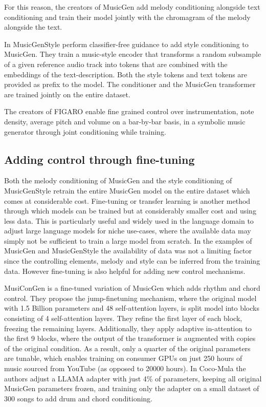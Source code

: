 For this reason, the creators of MusicGen \cite{copet2023simple} add melody conditioning alongside text conditioning and train their model jointly with the chromagram of the melody alongside the text.

In MusicGenStyle \cite{Rouard_Adi_Copet_Roebel_Défossez_musicgenstyle_2024} perform classifier-free guidance to add style conditioning to MusicGen. They train a music-style encoder that transforms a random subsample of a given reference audio track into tokens that are combined with the embeddings of the text-description. Both the style tokens and text tokens are provided as prefix to the model. The conditioner and the MusicGen transformer are trained jointly on the entire dataset. 

The creators of FIGARO\cite{Rütte_figaro_2023} enable fine grained control over instrumentation, note density, average pitch and volume on a bar-by-bar basis, in a symbolic music generator through joint conditioning while training. 

\subsection{Adding control through fine-tuning}

Both the melody conditioning of MusicGen \cite{copet2023simple} and the style conditioning of MusicGenStyle \cite{Rouard_Adi_Copet_Roebel_Défossez_musicgenstyle_2024} retrain the entire MusicGen model on the entire dataset which comes at considerable cost. Fine-tuning or transfer learning is another method through which models can be trained but at considerably smaller cost and using less data. This is particularly useful and widely used in the language domain to adjust large language models for niche use-cases, where the available data may simply not be sufficient to train a large model from scratch. In the examples of MusicGen and MusicGenStyle the availability of data was not a limiting factor since the controlling elements, melody and style can be inferred from the training data. However fine-tuning is also helpful for adding new control mechanisms.

MusiConGen \cite{Lan_Hsiao_Cheng_Yang_musicongen_2024} is a fine-tuned variation of MusicGen which adds rhythm and chord control. They propose the jump-finetuning mechanism, where the original model with 1.5 Billion parameters and 48 self-attention layers, is split model into blocks consisting of 4 self-attention layers. They refine the first layer of each block, freezing the remaining layers. Additionally, they apply adaptive in-attention to the first 9 blocks, where the output of the transformer is augmented with copies of the original condition. As a result, only a quarter of the original parameters are tunable, which enables training on consumer GPUs on just 250 hours of music sourced from YouTube (as opposed to 20000 hours).  In Coco-Mula \cite{Lin_cocomulla_2024} the authors adjust a LLAMA adapter with just 4\% of parameters, keeping all original MusicGen parameters frozen, and training only the adapter on a small dataset of 300 songs to add drum and chord conditioning. 

